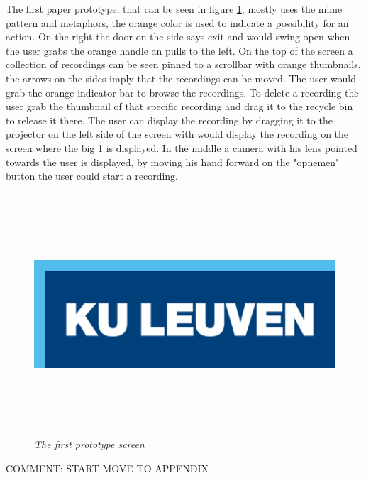 The first paper prototype, that can be seen in figure \ref{first prototype}, mostly uses the mime pattern and metaphors, the orange color is used to indicate a possibility for an action. On the right the door on the side says exit and would swing open when the user grabs the orange handle an pulls to the left. On the top of the screen a collection of recordings can be seen pinned to a scrollbar with orange thumbnails, the arrows on the sides imply that the recordings can be moved. The user would grab the orange indicator bar to browse the recordings. To delete a recording the user grab the thumbnail of that specific recording and drag it to the recycle bin to release it there. The user can display the recording by dragging it to the projector on the left side of the screen with would display the recording on the screen where the big 1 is displayed. In the middle a camera with his lens pointed towards the user is displayed, by moving his hand forward on the "opnemen" button the user could start a recording.

\begin{figure}[H]
	\begin{center}
		\includegraphics[width=16cm, height=9cm]{KUL.png}
		\caption{\emph{The first prototype screen}}
		\label{first prototype}
	\end{center}
\end{figure}

{\large COMMENT: START MOVE TO APPENDIX}

